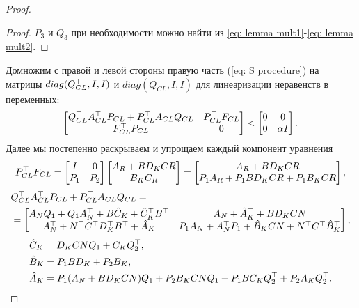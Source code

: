\begin{proof}
\begin{proof}
		${P}_3$ и ${Q}_3$ при необходимости можно найти из \eqref{eq: lemma mult1}-\eqref{eq: lemma mult2}.
	\end{proof}
	Домножим с правой и левой стороны правую часть (\ref{eq: S procedure}) на матрицы $diag({Q}_{CL}^\top, {I}, {I})$ и $diag({Q}_{CL}, {I}, {I})$ для линеаризации неравенств в переменных:
	\begin{align}
		\begin{bmatrix}
			{Q}_{CL}^\top{A}_{CL}^\top {P}_{CL} + {P}_{CL}^\top{A}_{CL}{Q}_{CL} & {P}_{CL}^\top{F}_{CL} \\
			{F}_{CL}^\top{P}_{CL} & 0
		\end{bmatrix} < 
		\begin{bmatrix}
			0 & 0\\
			0 & \alpha {I}
		\end{bmatrix}.
	\end{align}
	Далее мы постепенно раскрываем и упрощаем каждый компонент уравнения
	\begin{align}
		{P}_{CL}^\top{F}_{CL} = \begin{bmatrix}
			{I} & 0 \\
			{P}_{1} & {P}_{2}
		\end{bmatrix}
		\begin{bmatrix}
			{A}_R + {B}{D}_K{C}{R}\\ {B}_K{C}_R
		\end{bmatrix} =
		\begin{bmatrix}
			{A}_R + {B}{D}_K{C}{R}\\
			{P}_{1}{A}_R + {P}_{1}{B}{D}_K{C}{R}+{P}_1{B}_K{C}{R}
		\end{bmatrix},
	\end{align}
	\begin{align}
		&{Q}_{CL}^\top{A}_{CL}^\top {P}_{CL} + {P}_{CL}^\top{A}_{CL}{Q}_{CL} = \nonumber \\
		& = \begin{bmatrix}
			{A}_N{Q}_{1} +{Q}_{1}{A}_N^\top + {B}{\hat{C}}_K +{\hat{C}}_K^\top{B}^\top & {A}_N + {\hat{A}}_K^\top +{B}{D}_K{C}{N}\\
			{A}_N^\top + {N}^\top{C}^\top{D}_K^\top{B}^\top+{\hat{A}}_K & {P}_{1}{A}_N +{A}_N^\top{P}_{1}+{\hat{B}}_K{C}{N}+{N}^\top{C}^\top{\hat{B}}_K^\top
		\end{bmatrix},   
	\end{align}
	\begin{align}
		&{\hat{C}}_K= {D}_K{C}{N}{Q}_{1} + {C}_K{Q}_{2}\T,\\
		&{\hat{B}}_K = {P}_{1}{B}{D}_K + {P}_{2}{B}_K,\\
		&{\hat{A}}_K = {P}_{1}({A}_N+{B}{D}_K{C}{N}){Q}_{1}+{P}_{2}{B}_K{C}{N}{Q}_{1}+{P}_{1}{B}{C}_K{Q}_{2}\T+{P}_{2}{A}_K{Q}_{2}\T.

\end{align}
\end{proof}
